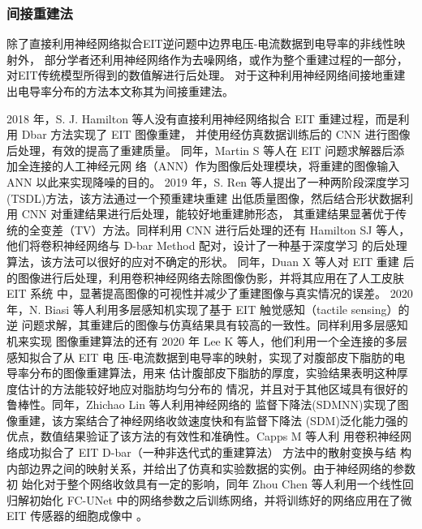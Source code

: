 \subsubsection{间接重建法}
除了直接利用神经网络拟合EIT逆问题中边界电压-电流数据到电导率的非线性映射外，
部分学者还利用神经网络作为去噪网络，或作为整个重建过程的一部分，对EIT传统模型所得到的数值解进行后处理。
对于这种利用神经网络间接地重建出电导率分布的方法本文称其为间接重建法。 

2018 年，S. J. Hamilton 等人没有直接利用神经网络拟合 EIT 重建过程，而是利用 Dbar 方法实现了 EIT 图像重建，
并使用经仿真数据训练后的 CNN 进行图像后处理，有效的提高了重建质量\cite{8352045}。
同年，Martin S 等人在 EIT 问题求解器后添加全连接的人工神经元网
络（ANN）作为图像后处理模块，将重建的图像输入 ANN 以此来实现降噪的目的\cite{S2017A}。
2019 年，S. Ren 等人提出了一种两阶段深度学习(TSDL)方法，该方法通过一个预重建块重建
出低质量图像，然后结合形状数据利用 CNN 对重建结果进行后处理，能较好地重建肺形态，
其重建结果显著优于传统的全变差（TV）方法\cite{8907811}。同样利用 CNN 进行后处理的还有
Hamilton SJ 等人，他们将卷积神经网络与 D-bar Method 配对，设计了一种基于深度学习
的后处理算法，该方法可以很好的应对不确定的形状\cite{2019Beltrami}。 同年，Duan X 等人对 EIT 重建
后的图像进行后处理，利用卷积神经网络去除图像伪影，并将其应用在了人工皮肤 EIT 系统
中，显著提高图像的可视性并减少了重建图像与真实情况的误差\cite{2019Artificial}。
2020 年，N. Biasi 等人利用多层感知机实现了基于 EIT 触觉感知（tactile sensing）的逆
问题求解，其重建后的图像与仿真结果具有较高的一致性\cite{9278823}。同样利用多层感知机来实现
图像重建算法的还有 2020 年 Lee K 等人，他们利用一个全连接的多层感知拟合了从 EIT 电
压-电流数据到电导率的映射，实现了对腹部皮下脂肪的电导率分布的图像重建算法，用来
估计腹部皮下脂肪的厚度，实验结果表明这种厚度估计的方法能较好地应对脂肪均匀分布的
情况，并且对于其他区域具有很好的鲁棒性\cite{2020Electrical}。同年，Zhichao Lin 等人利用神经网络的
监督下降法(SDMNN)实现了图像重建，该方案结合了神经网络收敛速度快和有监督下降法
(SDM)泛化能力强的优点，数值结果验证了该方法的有效性和准确性\cite{9060508}。Capps M 等人利
用卷积神经网络成功拟合了 EIT D-bar（一种非迭代式的重建算法） 方法中的散射变换与结
构内部边界之间的映射关系，并给出了仿真和实验数据的实例\cite{9130138}。由于神经网络的参数初
始化对于整个网络收敛具有一定的影响，同年 Zhou Chen 等人利用一个线性回归解初始化
FC-UNet 中的网络参数之后训练网络，并将训练好的网络应用在了微 EIT 传感器的细胞成像中 \cite{9128764}。

